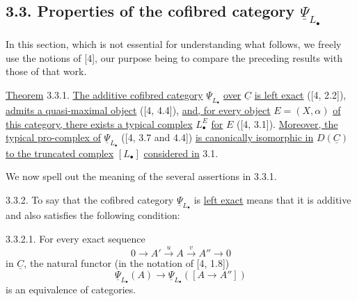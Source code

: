 
\subsection*{3.3. Properties of the cofibred category
$\underline\Psi_{L_\bullet}$}

In this section, which is not essential for understanding what
follows, we freely use the notions of [4], our purpose being to
compare the preceding results with those of that work.

\underline{Theorem} 3.3.1. \underline{The additive cofibred category}
$\underline\Psi_{L_\bullet}$ \underline{over} $\underline C$
\underline{is left exact} ([4, 2.2]), \underline{admits a
quasi-maximal object} ([4, 4.4]), \underline{and, for every object}
$E=(X,\alpha)$ \underline{of this category, there exists a typical
complex} $L^E_\bullet$ \underline{for} $E$ ([4, 3.1]).
\underline{Moreover, the typical pro-complex of}
$\underline\Psi_{L_\bullet}$ ([4, 3.7 and 4.4])
\underline{is canonically isomorphic in} $D(\underline C)$
\underline{to the truncated complex} $[L_\bullet]$
\underline{considered in} 3.1.

We now spell out the meaning of the several assertions in 3.3.1.

3.3.2. To say that the cofibred category
$\underline\Psi_{L_\bullet}$ is \underline{left exact} means that it
is additive and also satisfies the following condition:

3.3.2.1. For every exact sequence
\[
 0\longrightarrow A'\xrightarrow{u}A\xrightarrow{v}A''
 \longrightarrow0
\]
in $\underline C$, the natural functor (in the notation of [4, 1.8])
\[
 \underline\Psi_{L_\bullet}(A)
 \longrightarrow
 \underline\Psi_{L_\bullet}([A\longrightarrow A''])
\]
is an equivalence of categories.

